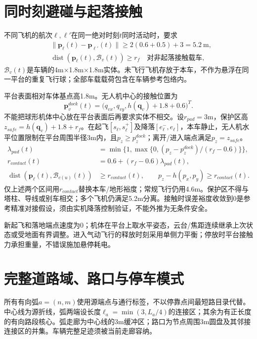 \section{同时刻避碰与起落接触}
\noindent 不同飞机的航次$\ell,\ell'$在同一绝对时刻$t$同时活动时，要求
\begin{align}
 &\|\mathbf p_\ell(t)-\mathbf p_{\ell'}(t)\|\ge
       2(0.6+0.5)+3=5.2\ \mathrm m,\label{eng:eq:collision}\\
 &\operatorname{dist}(\mathbf p_\ell(t),\mathcal B_v(t))\ge r_f
       \quad\text{对非起落接触载车},\label{eng:eq:airvehicle}
\end{align}
\noindent $\mathcal B_v(t)$是车辆的4m×1.8m×1.8m实体。未飞行飞机存放于本车，不作为悬浮在同一平台的重复飞行球；全部车载载荷包含在车辆参考包络内。

\noindent 平台表面相对车体基点高1.8m。无人机中心的接触位置为
\begin{equation}
 \mathbf p^{dock}_v(t)=\big(q_{vx},q_{vy},h(\mathbf q_v)+1.8+0.6\big)^T.
 \label{eng:eq:dock}
\end{equation}
\noindent 不能把球形机体中心放在平台表面后再要求实体不相交。设$r_{pad}=3$m，保护区高$z_{safe}=h(\mathbf q_v)+1.8+r_f$。在起飞$[s_\ell,s_\ell^+]$及降落$[e_\ell^-,e_\ell]$，本车静止，无人机水平位置限制在平台周围半径3m内，且$p_z\ge p_z^{dock}$；离开/进入端点满足$p_z=z_{safe}$。
\begin{align}
 \lambda_{pad}(t)&=\min\{1,\max\{0,(p_z-p_z^{dock})/(r_f-0.6)\}\},\\
 r_{contact}(t)&=0.6+(r_f-0.6)\lambda_{pad}(t),\\
 \operatorname{dist}(\mathbf p_\ell(t),\mathcal B_{c(u)}(t))&\ge r_{contact}(t),\qquad
 p_z-h(p_x,p_y)\ge r_{contact}(t).
 \label{eng:eq:padcontact}
\end{align}
\noindent 仅上述两个区间用$r_{contact}$替换本车/地形裕度；常规飞行仍用4.6m。保护区不得与塔柱、导线或别车相交；多个飞机仍满足5.2m分离。接触时误差裕度收敛到0是参考精准对接假设，须由实机降落控制验证，不能外推为无条件安全。

\noindent 新起飞和落地端点速度为0；机体在平台上取水平姿态，云台/焦距连续继承上次状态或受地面有界调整。进入气动飞行的释放时刻采用单侧力平衡；停放时平台接触力承担重量，不错误施加悬停耗电。
\clearpage

\section{完整道路域、路口与停车模式}
\noindent 所有有向弧$a=(n,m)$使用源端点与通行标签，不以停靠点间最短路目录代替。中心线为源折线，弧两端设长度$\ell_a=\min(3,L_a/4)$的连接区；其余为有正长度的有向路段核心。弧走廊为中心线的3m缓冲区；路口为节点周围3m圆盘及其邻接连接区的并集。车辆完整足迹须被当前走廊容纳。

